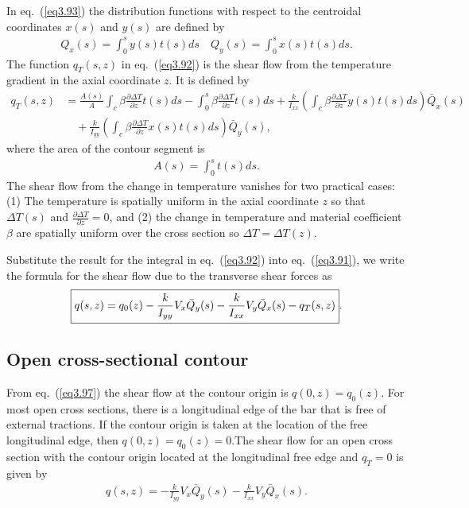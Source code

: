 \documentclass{AeroStructure-ERJohnson}
\begin{document}
\noindent In eq.~(\ref{eq3.93}) the distribution functions with respect to the centroidal coordinates $x(s)$ and $y(s)$ are defined by
\begin{align}\label{eq3.94}
Q_{x}(s)=\int_{0}^{s} y(s) t(s) d s \quad Q_{y}(s)=\int_{0}^{s} x(s) t(s) d s.
\end{align}
The function $q_{T}(s, z)$ in eq.~(\ref{eq3.92}) is the shear flow from the temperature gradient in the axial coordinate $z$. It is defined by
\begin{align}
q_{T}(s, z)&=\frac{A(s)}{A} \int_{c} \beta \frac{\partial \Delta T}{\partial z} t(s) d s-\int_{0}^{s} \beta \frac{\partial \Delta T}{\partial z} t(s) d s+\frac{k}{I_{x x}}\left(\int_{c} \beta \frac{\partial \Delta T}{\partial z} y(s) t(s) d s\right) \bar{Q}_{x}(s)\nonumber\\
&\quad +\frac{k}{I_{y y}}\left(\int_{c} \beta \frac{\partial \Delta T}{\partial z} x(s) t(s) d s\right) \bar{Q}_{y}(s),\label{eq3.95}
\end{align}
where the area of the contour segment is
\begin{align}\label{eq3.96}
A(s)=\int_{0}^{s} t(s) d s.
\end{align}
The shear flow from the change in temperature vanishes for two practical cases: (1) The temperature is spatially uniform in the axial coordinate $z$ so that $\Delta T(s)$ and $\frac{\partial \Delta T}{\partial z}=0$, and (2) the change in temperature and material coefficient $\beta$ are spatially uniform over the cross section so $\Delta T=\Delta T(z)$.

Substitute the result for the integral in eq.~(\ref{eq3.92}) into eq.~(\ref{eq3.91}), we write the formula for the shear flow due to the transverse shear forces as
\begin{align}\label{eq3.97}
\fbox{$\displaystyle q(s, z)=q_{0}(z)-\frac{k}{I_{y y}} V_{x} \bar{Q}_{y}(s)-\frac{k}{I_{x x}} V_{y} \bar{Q}_{x}(s)-q_{T}(s, z)$}.
\end{align}

\subsection{ Open cross-sectional contour}\label{sec3.8.1}

From eq.~(\ref{eq3.97}) the shear flow at the contour origin is $q(0, z)=q_{0}(z)$. For most open cross sections, there is a longitudinal edge of the bar that is free of external tractions. If the contour origin is taken at the location of the free longitudinal edge, then $q(0, z)=q_{0}(z)=0$.The shear flow for an open cross section with the contour origin located at the longitudinal free edge and $q_{T}=0$ is given by
\begin{align}\label{eq3.98}
q(s, z)=-\frac{k}{I_{y y}} V_{x} \bar{Q}_{y}(s)-\frac{k}{I_{x x}} V_{y} \bar{Q}_{x}(s).
\end{align}
\end{document}
